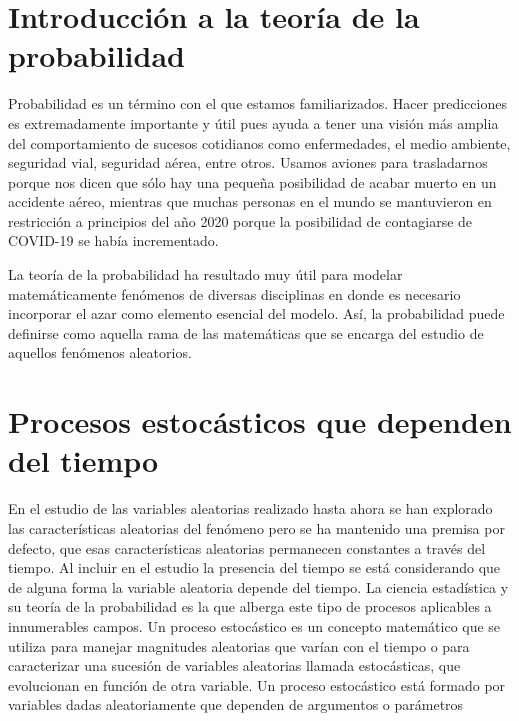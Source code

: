 \documentclass[a4paper,11pt]{book}
\begin{document}
\chapter{Introducción a la teoría de la probabilidad}
    Probabilidad es un término con el que estamos familiarizados. Hacer predicciones es extremadamente importante y útil pues ayuda a tener una visión más amplia del comportamiento de sucesos cotidianos como enfermedades, el medio ambiente, seguridad vial, seguridad aérea, entre otros.
    Usamos aviones para trasladarnos porque nos dicen que sólo hay una pequeña posibilidad de acabar muerto en un accidente aéreo, mientras que muchas personas en el mundo se mantuvieron en restricción a principios del año 2020 porque la posibilidad de contagiarse de COVID-19 se había incrementado.
    
    La teoría de la probabilidad ha resultado muy útil para modelar
    matemáticamente fenómenos de diversas disciplinas en donde es necesario incorporar el azar como elemento esencial del modelo. Así, la probabilidad puede definirse como
    aquella rama de las matemáticas que se encarga del estudio de aquellos fenómenos aleatorios.
    
    
    
    
    
    

\chapter{Procesos estocásticos que dependen del tiempo}
    En el estudio de las variables aleatorias realizado hasta ahora se han explorado las características aleatorias del fenómeno pero se ha mantenido una premisa por defecto, que esas
    características aleatorias permanecen constantes a través del tiempo. Al incluir en el estudio la presencia del tiempo se está considerando que de alguna forma la variable aleatoria depende del tiempo.
    La ciencia estadística y su teoría de la probabilidad es la que alberga este tipo de procesos aplicables a innumerables campos. Un proceso estocástico es un concepto matemático que se utiliza para manejar magnitudes aleatorias que varían con el tiempo o para caracterizar una sucesión de variables aleatorias llamada estocásticas, que evolucionan en función de otra variable. Un proceso estocástico está formado por variables dadas aleatoriamente que dependen de argumentos o parámetros
\end{document}
